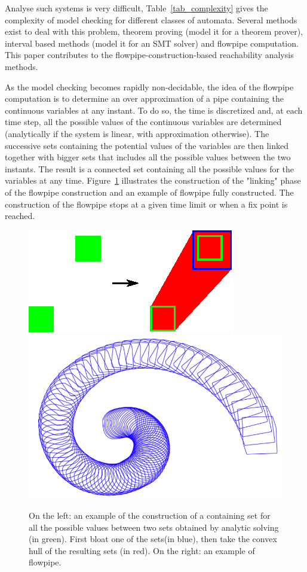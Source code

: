 Analyse such systems is very difficult, Table~\ref{tab_complexity} gives the complexity of model checking for different classes of automata. Several methods exist to deal with this problem, theorem proving (model it for a theorem prover), interval based methods (model it for an SMT solver) and flowpipe computation. This paper contributes to the flowpipe-construction-based reachability analysis methods. 

As the model checking becomes rapidly non-decidable, the idea of the flowpipe computation is to determine an over approximation of a pipe containing the continuous variables at any instant. To do so, the time is discretized and, at each time step, all the possible values of the continuous variables are determined (analytically if the system is linear, with approximation otherwise). The successive sets containing the potential values of the variables are then linked together with bigger sets that includes all the possible values between the two instants. The result is a connected set containing all the possible values for the variables at any time. Figure~\ref{fowpipeconstruction} illustrates the construction of the "linking" phase of the flowpipe construction and an example of flowpipe fully constructed. The construction of the flowpipe stops at a given time limit or when a fix point is reached.

\begin{figure}
\includegraphics[width=0.45\columnwidth]{images/flowpipe.eps}
\includegraphics[width=0.45\columnwidth]{images/zono.png}
\caption{On the left: an example of the construction of a containing set for all the possible values between two sets obtained by analytic solving (in green). First bloat one of the sets(in blue), then take the convex hull of the resulting sets (in red). On the right: an example of flowpipe.}
\label{fowpipeconstruction}
\end{figure}

